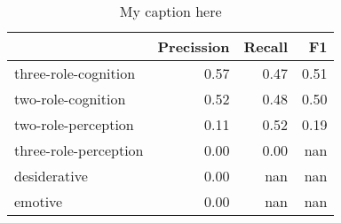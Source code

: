 \begin{table}[!ht]
\centering
\begin{tabular}{lrrr}
\toprule
{} &  Precission &  Recall &   F1 \\
\midrule
three-role-cognition  &        0.57 &    0.47 & 0.51 \\
two-role-cognition    &        0.52 &    0.48 & 0.50 \\
two-role-perception   &        0.11 &    0.52 & 0.19 \\
three-role-perception &        0.00 &    0.00 &  nan \\
desiderative          &        0.00 &     nan &  nan \\
emotive               &        0.00 &     nan &  nan \\
\bottomrule
\end{tabular}
\caption{My caption here}
\label{tab:MENTAL-oe-combined-F1}
\end{table}